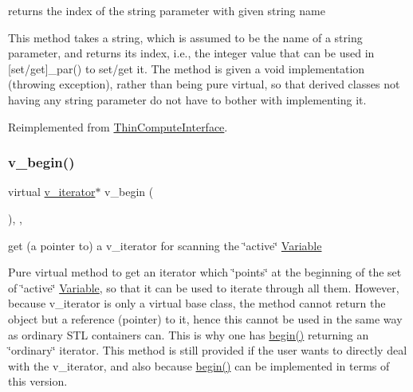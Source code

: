 returns the index of the string parameter with given string name 

This method takes a string, which is assumed to be the name of a string parameter, and returns its index, i.\+e., the integer value that can be used in \mbox{[}set/get\mbox{]}\+\_\+par() to set/get it. The method is given a void implementation (throwing exception), rather than being pure virtual, so that derived classes not having any string parameter do not have to bother with implementing it. 

Reimplemented from \mbox{\hyperlink{class_s_m_spp__di__unipi__it_1_1_thin_compute_interface_ac89d3c2e4aeb331035bc878f0f9deeae}{Thin\+Compute\+Interface}}.

\mbox{\label{class_s_m_spp__di__unipi__it_1_1_f_real_objective_ad0b5bcf42a678385fdba6fe41ce9626b}} 
\subsubsection{\texorpdfstring{v\+\_\+begin()}{v\_begin()}\hspace{0.1cm}{\footnotesize\ttfamily [1/2]}}
{\footnotesize\ttfamily virtual \mbox{\hyperlink{class_s_m_spp__di__unipi__it_1_1_thin_var_dep_interface_1_1v__iterator}{v\+\_\+iterator}}$\ast$ v\+\_\+begin (\begin{DoxyParamCaption}\item[{void}]{ }\end{DoxyParamCaption})\hspace{0.3cm}{\ttfamily [inline]}, {\ttfamily [override]}, {\ttfamily [virtual]}}



get (a pointer to) a v\+\_\+iterator for scanning the \char`\"{}active\char`\"{} \mbox{\hyperlink{class_s_m_spp__di__unipi__it_1_1_variable}{Variable}} 

Pure virtual method to get an iterator which \char`\"{}points\char`\"{} at the beginning of the set of \char`\"{}active\char`\"{} \mbox{\hyperlink{class_s_m_spp__di__unipi__it_1_1_variable}{Variable}}, so that it can be used to iterate through all them. However, because v\+\_\+iterator is only a virtual base class, the method cannot return the object but a reference (pointer) to it, hence this cannot be used in the same way as ordinary S\+TL containers can. This is why one has \mbox{\hyperlink{group___thin_var_dep_interface___c_l_a_s_s_e_s_ga79162df6cbf36b4997db545dc30969e2}{begin()}} returning an \char`\"{}ordinary\char`\"{} iterator. This method is still provided if the user wants to directly deal with the v\+\_\+iterator, and also because \mbox{\hyperlink{group___thin_var_dep_interface___c_l_a_s_s_e_s_ga79162df6cbf36b4997db545dc30969e2}{begin()}} can be implemented in terms of this version. 

